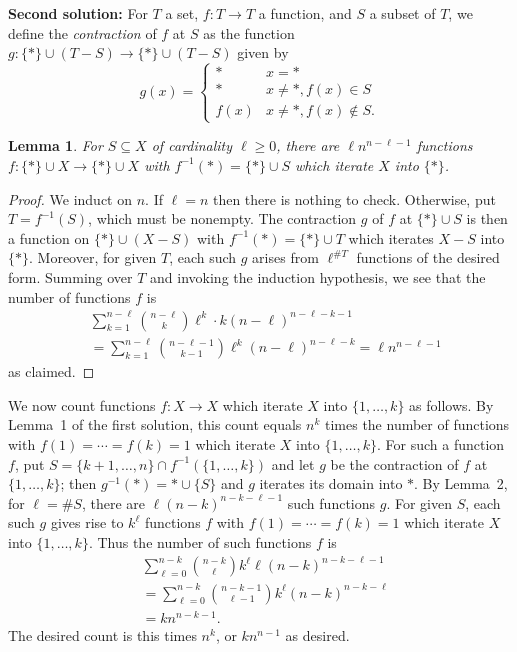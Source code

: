 \documentclass[amssymb,twocolumn,pra,10pt,aps]{revtex4-1}
\newtheorem{lemma}{Lemma}
\begin{document}
\begin{itemize}
\textbf{Second solution:}
For $T$ a set, $f: T \to T$ a function, and $S$ a subset of $T$,
we define the \emph{contraction} of $f$ at $S$ as the function $g: \{* \} \cup (T-S) \to \{*\}  \cup (T-S)$
given by
\[
g(x) = \begin{cases} * & x = *  \\
* & x \neq *, f(x) \in S \\
f(x) & x \neq *, f(x) \notin S.
\end{cases}
\]
\begin{lemma}
For $S \subseteq X$ of cardinality $\ell \geq 0$,
there are $\ell n^{n-\ell-1}$ functions $f: \{*\} \cup X \to \{*\} \cup X$ with $f^{-1}(*) = \{*\} \cup S$
which iterate $X$ into $\{*\}$.
\end{lemma}
\begin{proof}
We induct on $n$. If $\ell = n$ then there is nothing to check.
Otherwise, put $T = f^{-1}(S)$, which must be nonempty.
The contraction $g$ of $f$ at $\{*\} \cup S$ is then a function on $\{*\} \cup (X-S)$ with $f^{-1}(*) = \{*\} \cup T$ which iterates $X-S$ into $\{*\}$. Moreover, for given $T$, each such $g$ arises from
$\ell^{\# T}$ functions of the desired form.
Summing over $T$ and invoking the induction hypothesis, we see that the number of functions $f$ is 
\begin{align*}
&\sum_{k=1}^{n-\ell} \binom{n-\ell}{k} \ell^k \cdot k (n-\ell)^{n-\ell-k-1} \\
&=\sum_{k=1}^{n-\ell} \binom{n-\ell-1}{k-1} \ell^k (n-\ell)^{n-\ell-k} 
= \ell n^{n-\ell-1}
\end{align*}
as claimed.
\end{proof}

We now count functions $f: X \to X$ which iterate $X$ into $\{1,\dots,k\}$ as follows. By Lemma~1 of the first solution, this count equals $n^k$ times the number of functions with $f(1) = \cdots = f(k) = 1$  which iterate $X$ into $\{1,\dots,k\}$. For such a function $f$, put $S = \{k+1,\dots,n\} \cap f^{-1}(\{1,\dots,k\})$ and let $g$ be the contraction of $f$
at $\{1,\dots,k\}$; then $g^{-1}(*) = * \cup \{S\}$ and $g$ iterates 
its domain into $*$. By Lemma~2, for $\ell = \#S$, there are
$\ell (n-k)^{n-k-\ell-1}$ such functions $g$.
For given $S$, each such $g$ gives rise to $k^{\ell}$ functions $f$ with $f(1) = \cdots = f(k) = 1$  which iterate $X$ into $\{1,\dots,k\}$.
Thus the number of such functions $f$ is
\begin{align*}
&\sum_{\ell=0}^{n-k} \binom{n-k}{\ell} k^{\ell} \ell (n-k)^{n-k-\ell-1} \\
&= \sum_{\ell=0}^{n-k} \binom{n-k-1}{\ell-1} k^{\ell} (n-k)^{n-k-\ell}\\
&= k n^{n-k-1}.
\end{align*}
The desired count is this times $n^k$, or $k n^{n-1}$ as desired.


\end{itemize}
\end{document}
